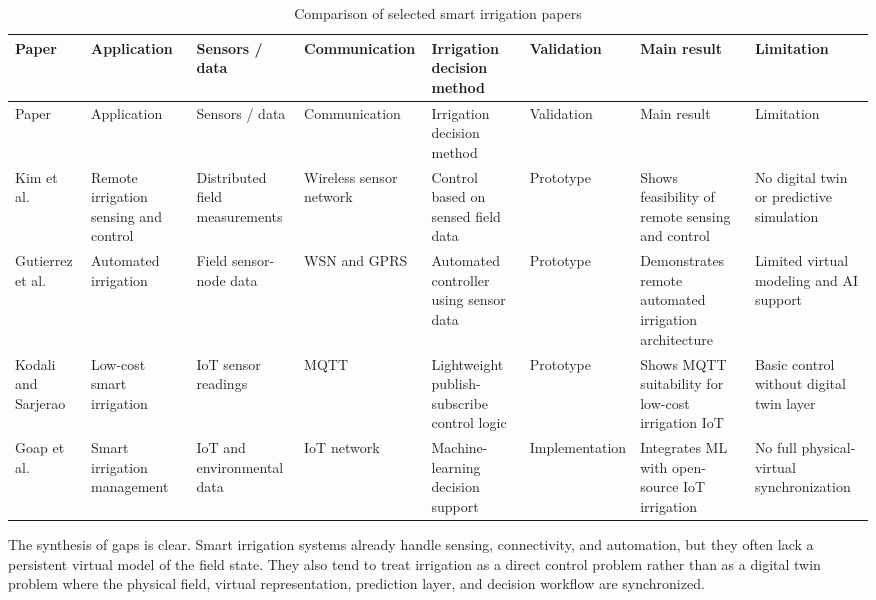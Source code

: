 \begingroup
\scriptsize
\setlength{\tabcolsep}{1pt}
\begin{longtable}{@{}>{\raggedright\arraybackslash}p{}>{\raggedright\arraybackslash}p{}>{\raggedright\arraybackslash}p{}>{\raggedright\arraybackslash}p{}>{\raggedright\arraybackslash}p{}>{\raggedright\arraybackslash}p{}>{\raggedright\arraybackslash}p{}>{\raggedright\arraybackslash}p{}@{}}
\caption{Comparison of selected smart irrigation papers}\\
\toprule
Paper & Application & Sensors / data & Communication & Irrigation decision method & Validation & Main result & Limitation \\
\midrule
\endfirsthead
\toprule
Paper & Application & Sensors / data & Communication & Irrigation decision method & Validation & Main result & Limitation \\
\midrule
\endhead
Kim et al. \cite{kim2008wsnIrrigation} & Remote irrigation sensing and control & Distributed field measurements & Wireless sensor network & Control based on sensed field data & Prototype & Shows feasibility of remote sensing and control & No digital twin or predictive simulation \\
Gutierrez et al. \cite{gutierrez2014wsnGprsIrrigation} & Automated irrigation & Field sensor-node data & WSN and GPRS & Automated controller using sensor data & Prototype & Demonstrates remote automated irrigation architecture & Limited virtual modeling and AI support \\
Kodali and Sarjerao \cite{kodali2017mqttirrigation} & Low-cost smart irrigation & IoT sensor readings & MQTT & Lightweight publish-subscribe control logic & Prototype & Shows MQTT suitability for low-cost irrigation IoT & Basic control without digital twin layer \\
Goap et al. \cite{goap2018iotMLIrrigation} & Smart irrigation management & IoT and environmental data & IoT network & Machine-learning decision support & Implementation & Integrates ML with open-source IoT irrigation & No full physical-virtual synchronization \\
\bottomrule
\end{longtable}
\endgroup

The synthesis of gaps is clear. Smart irrigation systems already handle sensing, connectivity, and automation, but they often lack a persistent virtual model of the field state. They also tend to treat irrigation as a direct control problem rather than as a digital twin problem where the physical field, virtual representation, prediction layer, and decision workflow are synchronized.
